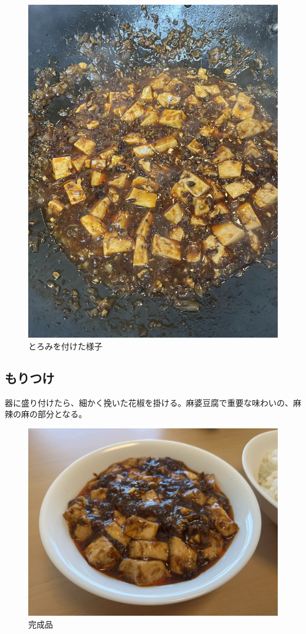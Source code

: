 \documentclass[a4paper,10pt,xelatex,ja=standard,twocolumn]{bxjsarticle}
\begin{document}
\begin{figure}[h]
  \caption{とろみを付けた様子}
  \label{tofu4}
  \begin{center}
    \includegraphics[height=\linewidth]{IMG_4087.jpg}
  \end{center}
\end{figure}

\subsection{もりつけ}

器に盛り付けたら、細かく挽いた花椒を掛ける。麻婆豆腐で重要な味わいの、麻辣の麻の部分となる。

\begin{figure}[h]
  \caption{完成品}
  \label{final}
  \begin{center}
    \includegraphics[width=\linewidth]{IMG_4089.jpg}
  \end{center}
\end{figure}
\end{document}
